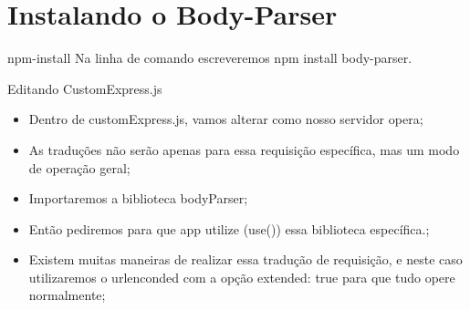 \documentclass{beamer}
\begin{document}
 \section{Instalando o Body-Parser}
    \begin{frame}[label=lists]{npm-install}
    Na linha de comando escreveremos \alert{npm install body-parser}.\\
	\begin{exampleblock}{Editando CustomExpress.js}
		\begin{itemize}
			\item Dentro de customExpress.js, vamos alterar como nosso servidor opera;
			\item As traduções não serão apenas para essa requisição específica, mas um modo de operação geral;
			\item Importaremos a biblioteca bodyParser;
			\item Então pediremos para que app utilize (use()) essa biblioteca específica.;
			\item Existem muitas maneiras de realizar essa tradução de requisição, e neste caso utilizaremos o urlenconded com a opção extended: true para que tudo opere normalmente;
		\end{itemize}
	\end{exampleblock}
	     \end{frame}
   
\end{document}
